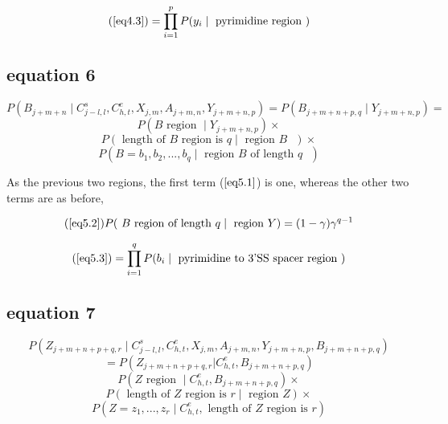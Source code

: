 \begin{equation}\label{py_emission}
(\ref{eq4.3}) = 
\prod_{i=1}^p P(y_i \; |\; \mbox{ pyrimidine region })
\end{equation}




\subsection{equation 6}
$$
P(B_{j+m+n}\; |\; C^s_{j-l,l},C^e_{h,t},X_{j,m},A_{j+m,n},Y_{j+m+n,p}) =
 P(B_{j+m+n+p,q}\; |\; Y_{j+m+n,p}) = 
$$
\begin{equation}\label{eq5.1}
P(B \mbox{ region } \; |\; Y_{j+m+n,p})\times
\end{equation}
\begin{equation}\label{eq5.2}
P( \mbox{ length of $B$ region is }q \; | \; \mbox{ region $B$ } ) \times
\end{equation}
\begin{equation}\label{eq5.3}
P( B = b_1,b_2,...,b_q \; |\; \mbox{ region $B$ of length $q$ } )
\end{equation} 



As the previous two regions, the first term ($\ref{eq5.1}$) is one, whereas
the other two terms are as before,


\begin{equation}\label{spacer_length}
(\ref{eq5.2}) 
P( \mbox{ $B$ region  of length }q\; | \; \mbox{ region $Y$} ) = (1- \gamma) \gamma^{q-1}
\end{equation}

\begin{equation}\label{spacer_emission}
(\ref{eq5.3}) = 
\prod_{i=1}^q P(b_i \; |\; \mbox{ pyrimidine to 3'SS spacer  region })
\end{equation}





\subsection{equation 7}
$$
P( Z_{j+m+n+p+q,r}\; | \;
C^s_{j-l,l},C^e_{h,t},X_{j,m},A_{j+m,n},Y_{j+m+n,p},B_{j+m+n+p,q})
$$
$$
 = P( Z_{j+m+n+p+q,r} | C^e_{h,t}, B_{j+m+n+p,q})
$$ 
\begin{equation}\label{eq6.1}
P(Z \mbox{ region } \; |\; C^e_{h,t}, B_{j+m+n+p,q} ) \times
\end{equation}
\begin{equation}\label{eq6.2}
P( \mbox{ length of $Z$ region is }r \; | \; \mbox{ region $Z$}  ) \times
\end{equation}
\begin{equation}\label{eq6.3}
P( Z = z_1,...,z_r \; |\; C^e_{h,t}, \mbox{ length of $Z$ region is }r) 
\end{equation}

